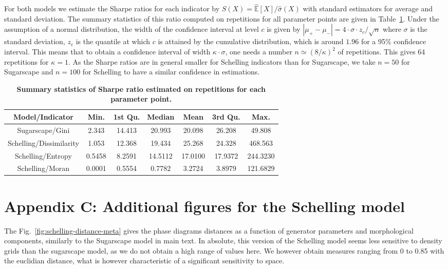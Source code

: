 \documentclass{JASSS}
\begin{document}
For both models we estimate the Sharpe ratios for each indicator by $S(X) = \hat{\mathbb{E}}\left[X\right]/\hat{\sigma}(X)$ with standard estimators for average and standard deviation. The summary statistics of this ratio computed on repetitions for all parameter points are given in Table~\ref{tab:summarysharpes}. Under the assumption of a normal distribution, the width of the confidence interval at level $c$ is given by $\left|\mu_+ - \mu_-\right| = 4\cdot \sigma \cdot z_{c} / \sqrt{n}$ where $\sigma$ is the standard deviation, $z_{c}$ is the quantile at which $c$ is attained by the cumulative distribution, which is around $1.96$ for a 95\% confidence interval. This means that to obtain a confidence interval of width $\kappa \cdot \sigma$, one needs a number $n \simeq (8 / \kappa )^2$ of repetitions. This gives 64 repetitions for $\kappa = 1$. As the Sharpe ratios are in general smaller for Schelling indicators than for Sugarscape, we take $n = 50$ for Sugarscape and $n = 100$ for Schelling to have a similar confidence in estimations.


\begin{table}[!t]
\centering
	\begin{tabular}{|c|cccccc|}
	\hline
Model/Indicator & Min. & 1st Qu. &  Median &  Mean & 3rd Qu. & Max. \\\hline
Sugarscape/Gini & 2.343 & 14.413 & 20.993 & 20.098 & 26.208 & 49.808\\\hline 
Schelling/Dissimilarity & 1.053 & 12.368 & 19.434 & 25.268 & 24.328 & 468.563\\
Schelling/Entropy & 0.5458 & 8.2591 & 14.5112 & 17.0100 & 17.9372 & 244.3230\\
Schelling/Moran & 0.0001 & 0.5554 & 0.7782 & 3.2724 & 3.8979 & 121.6829\\\hline
    \end{tabular}
    \caption{\textbf{Summary statistics of Sharpe ratio estimated on repetitions for each parameter point.}}
\label{tab:summarysharpes}
\end{table}



\section{Appendix C: Additional figures for the Schelling model}

The Fig.~\ref{fig:schelling-distance-meta} gives the phase diagrams distances as a function of generator parameters and morphological components, similarly to the Sugarscape model in main text. In absolute, this version of the Schelling model seems less sensitive to density grids than the sugarscape model, as we do not obtain a high range of values here. We however obtain measures ranging from 0 to 0.85 with the euclidian distance, what is however characteristic of a significant sensitivity to space.
\end{document}
